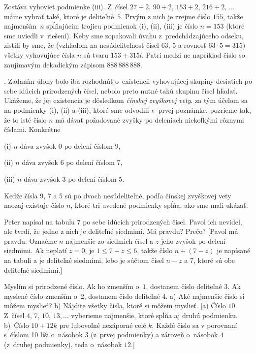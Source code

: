 {Zostáva vyhovieť podmienke (iii). Z~čísel
$27+2$, $90+2$, $153+2$, $216+2$, $\ldots$ máme vybrať také,
ktoré je deliteľné~$5$. Prvým z nich je zrejme číslo
$155$, takže najmenším~$n$ spĺňajúcim trojicu podmienok (i), (ii),
(iii) je číslo $n=153$ (ktoré sme uviedli v~riešení).
Keby sme zopakovali úvahu z~predchádzajúceho odseku,
zistili by sme, že (vzhľadom na nesúdeliteľnosť čísel $63$, $5$
a rovnosť $63\cdot5=315$) všetky vyhovujúce čísla $n$ sú tvaru
$153+315l$. Patrí medzi ne napríklad číslo so zaujímavým
dekadickým zápisom $888\,888\,888$.

.
Zadaním úlohy bolo iba rozhodnúť o~existencii vyhovujúcej
skupiny desiatich po sebe idúcich prirodzených čísel, nebolo preto
nutné takú skupinu čísel hľadať. Ukážeme, že jej existencia
je dôsledkom \emph{čínskej zvyškovej vety}.
za tým účelom sa na podmienky (i), (ii) a (iii), ktoré sme odvodili v~prvej poznámke, pozrieme tak, že to isté číslo $n$ má dávať
požadované zvyšky po deleniach niekoľkými rôznymi číslami. Konkrétne

\smallskip
\item{(i)} $n$ dáva zvyšok $0$ po delení číslom $9$,
\item{(ii)} $n$ dáva zvyšok $6$ po delení číslom $7$,
\item{(iii)} $n$ dáva zvyšok $3$ po delení číslom $5$.

\smallskip\noindent
Keďže čísla 9, 7 a 5 sú po dvoch nesúdeliteľné, podľa čínskej
zvyškovej vety naozaj existuje číslo $n$, ktoré
tri uvedené podmienky spĺňa, ako sme mali ukázať.


Peter napísal na tabuľu 7 po sebe idúcich prirodzených čísel.
Pavol ich nevidel, ale tvrdí, že jedno z nich je deliteľné siedmimi.
Má pravdu? Prečo?
[Pavol má pravdu. Označme $n$ najmenšie zo siedmich čísel a $z$
jeho zvyšok po delení siedmimi. Ak neplatí $z=0$, je
$1\le7-z\le6$,
takže číslo $n+(7-z)$ je napísané na tabuli a je deliteľné siedmimi,
lebo je súčtom čísel $n-z$ a 7, ktoré sú obe deliteľné siedmimi.]

Myslím si prirodzené číslo. Ak ho zmenším o~$1$, dostanem
číslo deliteľné $3$. Ak myslené číslo zmenším o~$2$, dostanem
číslo deliteľné $4$.
a) Aké najmenšie číslo si môžem myslieť?
b) Nájdite všetky čísla, ktoré si môžem myslieť.
[a) Číslo $10$. Z~čísel $4$, $7$, $10$, $13,\ldots$
vyberieme najmenšie, ktoré spĺňa aj druhú podmienku. b)~Číslo
$10+12k$ pre ľubovoľné nezáporné celé $k$. Každé číslo sa v porovnaní s~číslom 10
líši o~násobok $3$ (z~prvej podmienky) a zároveň o~násobok $4$
(z~druhej podmienky), teda o~násobok $12$.]

}
